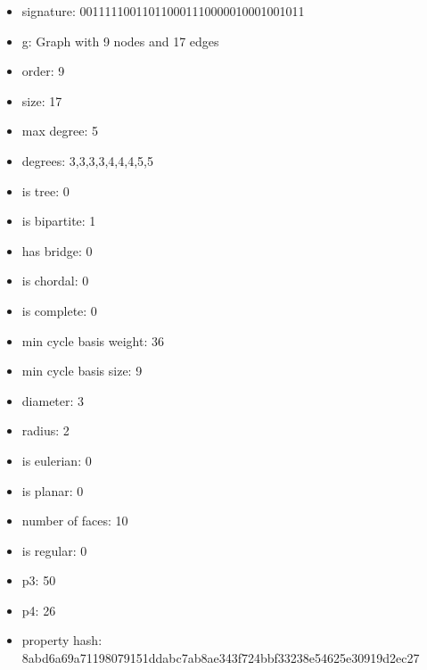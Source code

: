 \newpage
\begin{figure}
\end{figure}
\begin{itemize}
\item signature: 001111100110110001110000010001001011
\item g: Graph with 9 nodes and 17 edges
\item order: 9
\item size: 17
\item max degree: 5
\item degrees: 3,3,3,3,4,4,4,5,5
\item is tree: 0
\item is bipartite: 1
\item has bridge: 0
\item is chordal: 0
\item is complete: 0
\item min cycle basis weight: 36
\item min cycle basis size: 9
\item diameter: 3
\item radius: 2
\item is eulerian: 0
\item is planar: 0
\item number of faces: 10
\item is regular: 0
\item p3: 50
\item p4: 26
\item property hash: 8abd6a69a71198079151ddabc7ab8ae343f724bbf33238e54625e30919d2ec27
\end{itemize}
